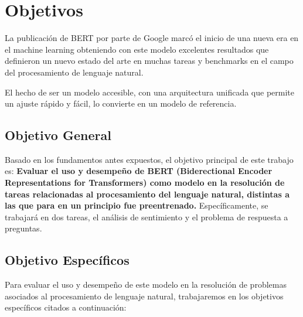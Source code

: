 
\cleardoublepage

\chapter{Objetivos}
\label{chapter-objetivos}

La publicación de BERT por parte de Google marcó el inicio de una nueva era en el machine learning obteniendo con este modelo excelentes resultados que definieron un nuevo estado del arte en muchas tareas y benchmarks en el campo del procesamiento de lenguaje natural.

El hecho de ser un modelo accesible, con una arquitectura unificada que permite un ajuste rápido y fácil, lo convierte en un modelo de referencia.

\section{Objetivo General}
\label{section-objetivo-general}

Basado en los fundamentos antes expuestos, el objetivo principal de este trabajo es: \textbf{Evaluar el uso y desempeño de BERT (Biderectional Encoder Representations for Transformers) como modelo en la resolución de tareas relacionadas al procesamiento del lenguaje natural, distintas a las que para en un principio fue preentrenado.} Específicamente, se trabajará en dos tareas, el análisis de sentimiento y el problema de respuesta a preguntas.
\medskip

\section{Objetivo Específicos}
\label{section-objetivos-especificos}

Para evaluar el uso y desempeño de este modelo en la resolución de problemas asociados al procesamiento de lenguaje natural, trabajaremos en los objetivos específicos citados a continuación:
\medskip

